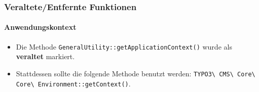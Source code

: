
\begin{frame}[fragile]
	\frametitle{Veraltete/Entfernte Funktionen}
	\framesubtitle{Anwendungskontext}

	\lstset{basicstyle=\tiny\ttfamily}

	\begin{itemize}
		\item Die Methode  \texttt{GeneralUtility::getApplicationContext()} wurde als \textbf{veraltet} markiert.
		\item Stattdessen sollte die folgende Methode benutzt werden:\newline
		 	\texttt{TYPO3\textbackslash
				CMS\textbackslash
				Core\textbackslash
				Core\textbackslash
				Environment::getContext()}.

	\end{itemize}

\end{frame}


